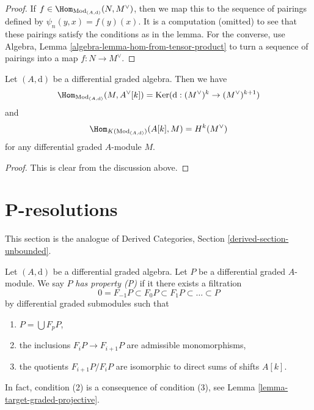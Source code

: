 \begin{proof}
If $f \in \Hom_{\text{Mod}_{(A, \text{d})}}(N, M^\vee)$, then we
map this to the sequence of pairings defined by
$\psi_n(y, x) = f(y)(x)$. It is a computation (omitted) to see
that these pairings satisfy the conditions as in the lemma.
For the converse, use
Algebra, Lemma \ref{algebra-lemma-hom-from-tensor-product} to turn a sequence
of pairings into a map $f : N \to M^\vee$.
\end{proof}

\begin{lemma}
\label{lemma-hom-into-shift-dual-free}
Let $(A, \text{d})$ be a differential graded algebra. Then we have
$$
\Hom_{\text{Mod}_{(A, \text{d})}}(M, A^\vee[k]) =
\text{Ker}(\text{d} : (M^\vee)^k \to (M^\vee)^{k + 1})
$$
and
$$
\Hom_{K(\text{Mod}_{(A, \text{d})})}(A[k], M) = H^k(M^\vee)
$$
for any differential graded $A$-module $M$.
\end{lemma}

\begin{proof}
This is clear from the discussion above.
\end{proof}















\section{P-resolutions}
\label{section-P-resolutions}

\noindent
This section is the analogue of
Derived Categories, Section \ref{derived-section-unbounded}.

\medskip\noindent
Let $(A, \text{d})$ be a differential graded algebra.
Let $P$ be a differential graded $A$-module. We say $P$
{\it has property (P)} if it there exists a filtration
$$
0 = F_{-1}P \subset F_0P \subset F_1P \subset \ldots \subset P
$$
by differential graded submodules such that
\begin{enumerate}
\item $P = \bigcup F_pP$,
\item the inclusions $F_iP \to F_{i + 1}P$ are admissible
monomorphisms,
\item the quotients $F_{i + 1}P/F_iP$ are isomorphic to direct
sums of shifts $A[k]$.
\end{enumerate}
In fact, condition (2) is a consequence of condition (3), see
Lemma \ref{lemma-target-graded-projective}.


